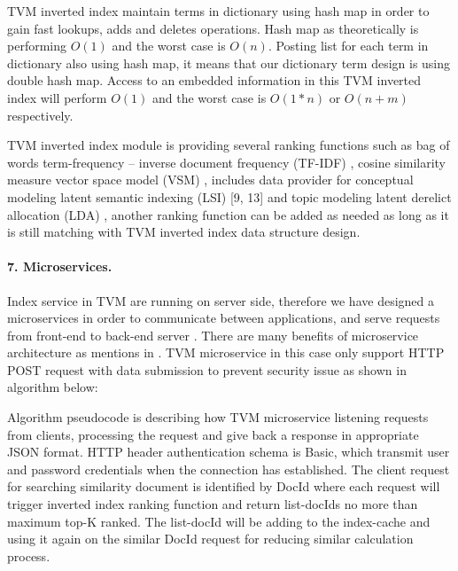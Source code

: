 TVM inverted index maintain terms in dictionary using hash map in order to gain fast lookups, adds and deletes operations. Hash map as theoretically is performing \(O(1)\) and the worst case is \(O(n)\). Posting list for each term in dictionary also using hash map, it means that our dictionary term design is using double hash map. Access to an embedded information in this TVM inverted index will perform \(O(1)\) and the worst case is \(O(1*n)\) or \(O(n + m)\) respectively.

TVM inverted index module is providing several ranking functions such as bag of words term-frequency -- inverse document frequency (TF-IDF) \cite{ManningRaghavanSchutze}, cosine similarity measure vector space model (VSM) \cite{SaltonBuckley}, includes data provider for conceptual modeling latent semantic indexing (LSI) [9, 13] and topic modeling latent derelict allocation (LDA) \cite{BleiNgJordan}, another ranking function can be added as needed as long as it is still matching with TVM inverted index data structure design.

\paragraph{7. Microservices.} Index service in TVM are running on server side, therefore we have designed a microservices in order to communicate between applications, and serve requests from front-end to back-end server \cite{AnggaiBlekanovSergeev2015}. There are many benefits of microservice architecture as mentions in \cite{Singleton,GuoWangZeng,Bakshi}. TVM microservice in this case only support HTTP POST request with data submission to prevent security issue as shown in algorithm below:

\begin{figure}[ht]
	\label{fig:algoQuery}
\end{figure}

Algorithm pseudocode is describing how TVM microservice listening requests from clients, processing the request and give back a response in appropriate JSON format. HTTP header authentication schema is Basic, which transmit user and password credentials when the connection has established. The client request for searching similarity document is identified by DocId where each request will trigger inverted index ranking function and return list-docIds no more than maximum top-K ranked. The list-docId will be adding to the index-cache and using it again on the similar DocId request for reducing similar calculation process.

